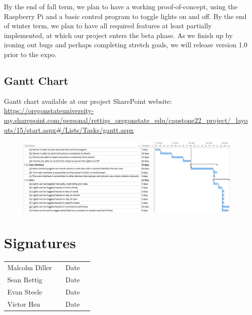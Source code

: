 \documentclass[12pt]{article}
\begin{document}
By the end of fall term, we plan to have a working proof-of-concept, using the
Raspberry Pi and a basic control program to toggle lights on and off.  By the
end of winter term, we plan to have all required features at least partially
implemented, at which our project enters the beta phase.  As we finish up by
ironing out bugs and perhaps completing stretch goals, we will release version
1.0 prior to the expo.

\subsection{Gantt Chart}
Gantt chart available at our project SharePoint website: \url{https://oregonstateuniversity-my.sharepoint.com/personal/rettigs_oregonstate_edu/capstone22_project/_layouts/15/start.aspx#/Lists/Tasks/gantt.aspx}
\begin{figure}
\includegraphics[width=1.1\textwidth]{gantt.png}
\end{figure}

\pagebreak

\section{Signatures}

\begin{tabular}{l l l l} Malcolm Diller & \underline{\hspace{6cm}} & Date
\underline{\hspace{2cm}}\\ Sean Rettig & \underline{\hspace{6cm}} & Date
\underline{\hspace{2cm}}\\ Evan Steele & \underline{\hspace{6cm}} & Date
\underline{\hspace{2cm}}\\ Victor Hsu & \underline{\hspace{6cm}} & Date
\underline{\hspace{2cm}} \end{tabular}
    
\end{document}
